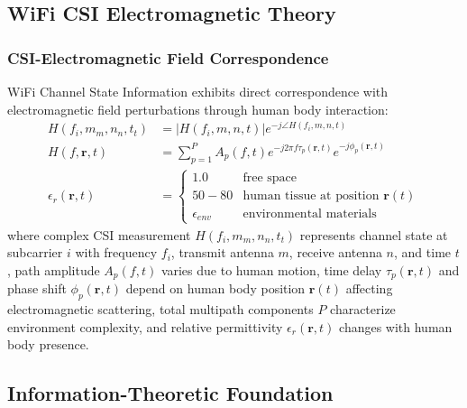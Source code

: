 \documentclass[journal]{IEEEtran}
\newcommand{\csi}[4]{H(f_{#1},m_{#2},n_{#3},t_{#4})}
\begin{document}
\subsection{WiFi CSI Electromagnetic Theory}

\subsubsection{CSI-Electromagnetic Field Correspondence}
\label{sec:csi_electromagnetic}
WiFi Channel State Information exhibits direct correspondence with electromagnetic field perturbations through human body interaction:
\begin{align}
\csi{i}{m}{n}{t} &= |H(f_i,m,n,t)|e^{-j\angle H(f_i,m,n,t)} \label{eq:csi_complex} \\
H(f,\mathbf{r},t) &= \sum_{p=1}^{P} A_p(f,t) e^{-j2\pi f \tau_p(\mathbf{r},t)} e^{-j\phi_p(\mathbf{r},t)} \label{eq:multipath_complete} \\
\epsilon_r(\mathbf{r},t) &= \begin{cases}
1.0 & \text{free space} \\
50-80 & \text{human tissue at position } \mathbf{r}(t) \\
\epsilon_{env} & \text{environmental materials}
\end{cases} \label{eq:dielectric_complete}
\end{align}
where complex CSI measurement $\csi{i}{m}{n}{t}$ represents channel state at subcarrier $i$ with frequency $f_i$, transmit antenna $m$, receive antenna $n$, and time $t$, path amplitude $A_p(f,t)$ varies due to human motion, time delay $\tau_p(\mathbf{r},t)$ and phase shift $\phi_p(\mathbf{r},t)$ depend on human body position $\mathbf{r}(t)$ affecting electromagnetic scattering, total multipath components $P$ characterize environment complexity, and relative permittivity $\epsilon_r(\mathbf{r},t)$ changes with human body presence.

\subsection{Information-Theoretic Foundation}
\end{document}
